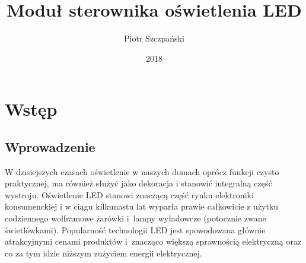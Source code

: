 \documentclass[12pt, eng, twoside, openany, final]{mgr}
\author{Piotr Szczpański}
\title{Moduł sterownika oświetlenia LED}
\date{2018}
\begin{document}
\maketitle
\tableofcontents

\newpage

\pagestyle{fancy}
\fancyhead{} 
\fancyfoot{} 
\rfoot{\thepage}


\chapter{Wstęp}
\thispagestyle{fancy}
    \section{Wprowadzenie}
    W dzisiejszych czasach oświetlenie w naszych domach oprócz funkcji czysto praktycznej, ma również służyć jako dekoracja i stanowić integralną część wystroju. Oświetlenie LED stanowi znaczącą część rynku elektroniki konsumenckiej i w ciągu kilkunastu lat wyparła prawie całkowicie z użytku codziennego wolframowe żarówki i~lampy wyładowcze (potocznie zwane świetlówkami). Popularność technologii LED jest spowodowana głównie atrakcyjnymi cenami produktów i~znacząco większą sprawnością elektryczną oraz co za tym idzie niższym zużyciem energii elektrycznej.
    
\end{document}
